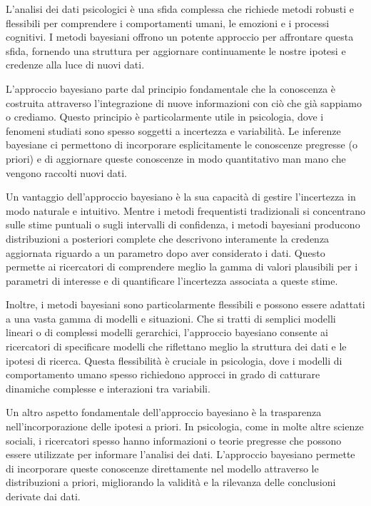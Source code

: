 \documentclass[
  letterpaper,
  krantz2]{{[}./krantz{]}}
\begin{document}

L'analisi dei dati psicologici è una sfida complessa che richiede metodi
robusti e flessibili per comprendere i comportamenti umani, le emozioni
e i processi cognitivi. I metodi bayesiani offrono un potente approccio
per affrontare questa sfida, fornendo una struttura per aggiornare
continuamente le nostre ipotesi e credenze alla luce di nuovi dati.

L'approccio bayesiano parte dal principio fondamentale che la conoscenza
è costruita attraverso l'integrazione di nuove informazioni con ciò che
già sappiamo o crediamo. Questo principio è particolarmente utile in
psicologia, dove i fenomeni studiati sono spesso soggetti a incertezza e
variabilità. Le inferenze bayesiane ci permettono di incorporare
esplicitamente le conoscenze pregresse (o priori) e di aggiornare queste
conoscenze in modo quantitativo man mano che vengono raccolti nuovi
dati.

Un vantaggio dell'approccio bayesiano è la sua capacità di gestire
l'incertezza in modo naturale e intuitivo. Mentre i metodi frequentisti
tradizionali si concentrano sulle stime puntuali o sugli intervalli di
confidenza, i metodi bayesiani producono distribuzioni a posteriori
complete che descrivono interamente la credenza aggiornata riguardo a un
parametro dopo aver considerato i dati. Questo permette ai ricercatori
di comprendere meglio la gamma di valori plausibili per i parametri di
interesse e di quantificare l'incertezza associata a queste stime.

Inoltre, i metodi bayesiani sono particolarmente flessibili e possono
essere adattati a una vasta gamma di modelli e situazioni. Che si tratti
di semplici modelli lineari o di complessi modelli gerarchici,
l'approccio bayesiano consente ai ricercatori di specificare modelli che
riflettano meglio la struttura dei dati e le ipotesi di ricerca. Questa
flessibilità è cruciale in psicologia, dove i modelli di comportamento
umano spesso richiedono approcci in grado di catturare dinamiche
complesse e interazioni tra variabili.

Un altro aspetto fondamentale dell'approccio bayesiano è la trasparenza
nell'incorporazione delle ipotesi a priori. In psicologia, come in molte
altre scienze sociali, i ricercatori spesso hanno informazioni o teorie
pregresse che possono essere utilizzate per informare l'analisi dei
dati. L'approccio bayesiano permette di incorporare queste conoscenze
direttamente nel modello attraverso le distribuzioni a priori,
migliorando la validità e la rilevanza delle conclusioni derivate dai
dati.
\end{document}
